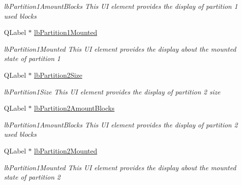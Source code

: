 \begin{DoxyCompactItemize}
\begin{DoxyCompactList}\small\item\em lb\+Partition1\+Amount\+Blocks This UI element provides the display of partition 1 used blocks \end{DoxyCompactList}\item 
\mbox{\label{classui_1_1window_1_1_disk_info_a15ba61260c684e95dd97fa92674a927e}} 
Q\+Label $\ast$ \mbox{\hyperlink{classui_1_1window_1_1_disk_info_a15ba61260c684e95dd97fa92674a927e}{lb\+Partition1\+Mounted}}
\begin{DoxyCompactList}\small\item\em lb\+Partition1\+Mounted This UI element provides the display about the mounted state of partition 1 \end{DoxyCompactList}\item 
\mbox{\label{classui_1_1window_1_1_disk_info_aa81ccf5936d3c5a683b429299901a623}} 
Q\+Label $\ast$ \mbox{\hyperlink{classui_1_1window_1_1_disk_info_aa81ccf5936d3c5a683b429299901a623}{lb\+Partition2\+Size}}
\begin{DoxyCompactList}\small\item\em lb\+Partition1\+Size This UI element provides the display of partition 2 size \end{DoxyCompactList}\item 
\mbox{\label{classui_1_1window_1_1_disk_info_a40396213defabc8a9b91bda033c2b85e}} 
Q\+Label $\ast$ \mbox{\hyperlink{classui_1_1window_1_1_disk_info_a40396213defabc8a9b91bda033c2b85e}{lb\+Partition2\+Amount\+Blocks}}
\begin{DoxyCompactList}\small\item\em lb\+Partition1\+Amount\+Blocks This UI element provides the display of partition 2 used blocks \end{DoxyCompactList}\item 
\mbox{\label{classui_1_1window_1_1_disk_info_aeba5bada8031f9ed4e73f8411dd78591}} 
Q\+Label $\ast$ \mbox{\hyperlink{classui_1_1window_1_1_disk_info_aeba5bada8031f9ed4e73f8411dd78591}{lb\+Partition2\+Mounted}}
\begin{DoxyCompactList}\small\item\em lb\+Partition1\+Mounted This UI element provides the display about the mounted state of partition 2 \end{DoxyCompactList}\item 

\end{DoxyCompactItemize}
